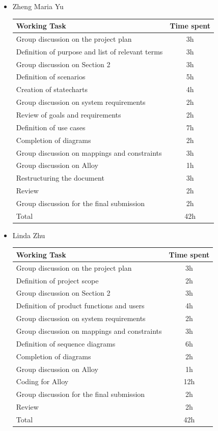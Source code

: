 \documentclass[12pt]{article}
\begin{document}
\begin{itemize}
    \item Zheng Maria Yu {
    \begin{center}
\begin{tabular}{| l | c |}
\hline
Working Task & Time spent \\
\hline
Group discussion on the project plan & 3h  \\
\hline
Definition of purpose and list of relevant terms & 3h  \\
\hline
Group discussion on Section 2 & 3h  \\
\hline
Definition of scenarios & 5h  \\
\hline
Creation of statecharts & 4h  \\
\hline
Group discussion on system requirements & 2h \\
\hline
Review of goals and requirements & 2h \\
\hline
Definition of use cases & 7h \\
\hline
Completion of diagrams & 2h \\
\hline
Group discussion on mappings and constraints & 3h \\
\hline
Group discussion on Alloy & 1h \\
\hline
Restructuring the document & 3h \\
\hline
Review & 2h \\
\hline
Group discussion for the final submission & 2h \\
\hline
Total & 42h \\
\hline
\end{tabular}
\end{center}
    }

\newpage
\item Linda Zhu {
    \begin{center}
\begin{tabular}{| l | c |}
\hline
Working Task & Time spent \\
\hline
Group discussion on the project plan & 3h  \\
\hline
Definition of project scope & 2h  \\
\hline
Group discussion on Section 2 & 3h  \\
\hline
Definition of product functions and users & 4h  \\
\hline
Group discussion on system requirements & 2h \\
\hline
Group discussion on mappings and constraints & 3h \\
\hline
Definition of sequence diagrams & 6h \\
\hline
Completion of diagrams & 2h \\
\hline
Group discussion on Alloy & 1h \\
\hline
Coding for Alloy & 12h \\
\hline
Group discussion for the final submission & 2h \\
\hline
Review & 2h \\
\hline
Total & 42h \\
\hline
\end{tabular}
\end{center}
    }
\end{itemize}
\end{document}
